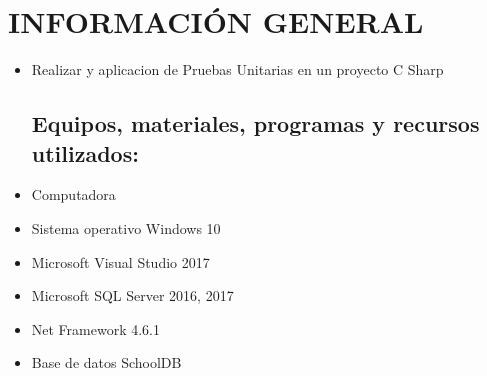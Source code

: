 \section{INFORMACIÓN GENERAL} 

\begin{itemize}
\subsection{Objetivos:}
	\item Realizar y aplicacion de Pruebas Unitarias en un proyecto C Sharp

\subsection{Equipos, materiales, programas y recursos utilizados:}
	\item Computadora
	\item Sistema operativo Windows 10
	\item Microsoft Visual Studio 2017
	\item Microsoft SQL Server 2016, 2017
	\item Net Framework 4.6.1
	\item Base de datos SchoolDB

\end{itemize}